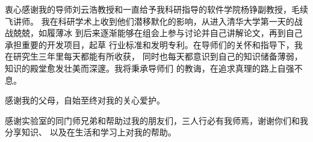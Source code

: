 \begin{acknowledgement}
  衷心感谢我的导师刘云浩教授和一直给予我科研指导的软件学院杨铮副教授，毛续飞讲师。
  我在科研学术上收到他们潜移默化的影响，从进入清华大学第一天的战战兢兢，如履薄冰
  到后来逐渐能够在组会上参与讨论并自己讲解论文，再到自己承担重要的开发项目，起草
  行业标准和发明专利。在导师们的关怀和指导下，我在研究生三年里每天都能有所收获，
  同时也每天都意识到自己的知识储备薄弱，知识的殿堂愈发壮美而深邃。我将秉承导师们
  的教诲，在追求真理的路上自强不息。

  感谢我的父母，自始至终对我的关心爱护。

  感谢实验室的同门师兄弟和帮助过我的朋友们，三人行必有我师焉，谢谢你们和我分享知识、
  以及在生活和学习上对我的帮助。
\end{acknowledgement}

